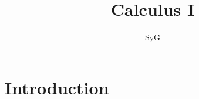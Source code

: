 \documentclass[12pt, a4paper]{book}
\begin{document}
\title{Calculus I}
\author{SyG}
\maketitle

\chapter{Introduction}
\end{document}
